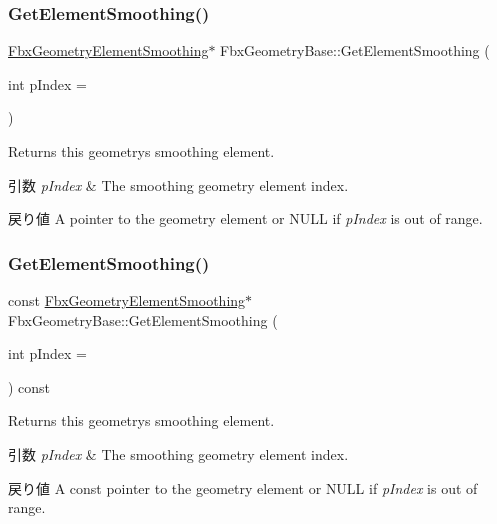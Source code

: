 \subsubsection{\texorpdfstring{Get\+Element\+Smoothing()}{GetElementSmoothing()}\hspace{0.1cm}{\footnotesize\ttfamily [1/2]}}
{\footnotesize\ttfamily \hyperlink{fbxlayer_8h_a6a651170dec994ac83db90645d9ecfd3}{Fbx\+Geometry\+Element\+Smoothing}$\ast$ Fbx\+Geometry\+Base\+::\+Get\+Element\+Smoothing (\begin{DoxyParamCaption}\item[{int}]{p\+Index = {} }\end{DoxyParamCaption})}

Returns this geometry\textquotesingle{}s smoothing element. 
\begin{DoxyParams}{引数}
{\em p\+Index} & The smoothing geometry element index. \\
\hline
\end{DoxyParams}
\begin{DoxyReturn}{戻り値}
A pointer to the geometry element or {\ttfamily N\+U\+LL} if {\itshape p\+Index} is out of range. 
\end{DoxyReturn}
\mbox{\label{class_fbx_geometry_base_a0a464128150ff6eee48b6913b22a1c49}} 
\subsubsection{\texorpdfstring{Get\+Element\+Smoothing()}{GetElementSmoothing()}\hspace{0.1cm}{\footnotesize\ttfamily [2/2]}}
{\footnotesize\ttfamily const \hyperlink{fbxlayer_8h_a6a651170dec994ac83db90645d9ecfd3}{Fbx\+Geometry\+Element\+Smoothing}$\ast$ Fbx\+Geometry\+Base\+::\+Get\+Element\+Smoothing (\begin{DoxyParamCaption}\item[{int}]{p\+Index = {} }\end{DoxyParamCaption}) const}

Returns this geometry\textquotesingle{}s smoothing element. 
\begin{DoxyParams}{引数}
{\em p\+Index} & The smoothing geometry element index. \\
\hline
\end{DoxyParams}
\begin{DoxyReturn}{戻り値}
A const pointer to the geometry element or {\ttfamily N\+U\+LL} if {\itshape p\+Index} is out of range. 
\end{DoxyReturn}
\mbox{\label{class_fbx_geometry_base_a65ce50bb6548a0c1cc3a237b1f953242}} 
